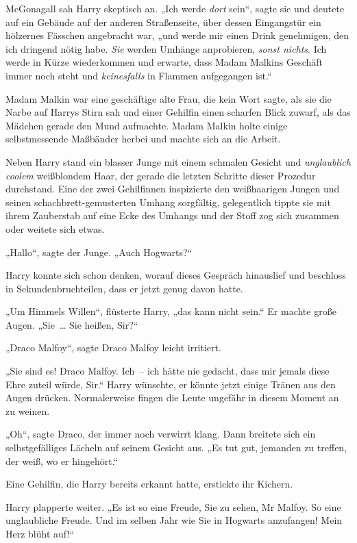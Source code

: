 McGonagall sah Harry skeptisch an. „Ich werde \emph{dort} sein“, sagte sie und deutete auf ein Gebäude auf der anderen Straßenseite, über dessen Eingangstür ein hölzernes Fässchen angebracht war, „und werde mir einen Drink genehmigen, den ich dringend nötig habe. \emph{Sie} werden Umhänge anprobieren, \emph{sonst nichts}. Ich werde in Kürze wiederkommen und erwarte, dass Madam Malkins Geschäft immer noch steht und \emph{keinesfalls} in Flammen aufgegangen ist.“

Madam Malkin war eine geschäftige alte Frau, die kein Wort sagte, als sie die Narbe auf Harrys Stirn sah und einer Gehilfin einen scharfen Blick zuwarf, als das Mädchen gerade den Mund aufmachte. Madam Malkin holte einige selbstmessende Maßbänder herbei und machte sich an die Arbeit.

Neben Harry stand ein blasser Junge mit einem schmalen Gesicht und \emph{unglaublich coolem} weißblondem Haar, der gerade die letzten Schritte dieser Prozedur durchstand. Eine der zwei Gehilfinnen inspizierte den weißhaarigen Jungen und seinen schachbrett-gemusterten Umhang sorgfältig, gelegentlich tippte sie mit ihrem Zauberstab auf eine Ecke des Umhangs und der Stoff zog sich zusammen oder weitete sich etwas.

„Hallo“, sagte der Junge. „Auch Hogwarts?“

Harry konnte sich schon denken, worauf dieses Gespräch hinauslief und beschloss in Sekundenbruchteilen, dass er jetzt genug davon hatte.

„Um Himmels Willen“, flüsterte Harry, „das kann nicht sein.“ Er machte große Augen. „Sie … Sie heißen, Sir?“

„Draco Malfoy“, sagte Draco Malfoy leicht irritiert.

„Sie sind es! Draco Malfoy. Ich – ich hätte nie gedacht, dass mir jemals diese Ehre zuteil würde, Sir.“ Harry wünschte, er könnte jetzt einige Tränen aus den Augen drücken. Normalerweise fingen die Leute ungefähr in diesem Moment an zu weinen.

„Oh“, sagte Draco, der immer noch verwirrt klang. Dann breitete sich ein selbstgefälliges Lächeln auf seinem Gesicht aus. „Es tut gut, jemanden zu treffen, der weiß, wo er hingehört.“

Eine Gehilfin, die Harry bereits erkannt hatte, erstickte ihr Kichern.

Harry plapperte weiter. „Es ist so eine Freude, Sie zu sehen, Mr Malfoy. So eine unglaubliche Freude. Und im selben Jahr wie Sie in Hogwarts anzufangen! Mein Herz blüht auf!“

